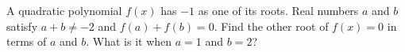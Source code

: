 A quadratic polynomial $f(x)$ has $-1$ as one of its roots. Real numbers $a$ and $b$ satisfy $a+b\ne-2$ and $f(a)+f(b)=0$. Find the other root of $f(x)=0$ in terms of $a$ and $b$. What is it when $a=1$ and $b=2$?
